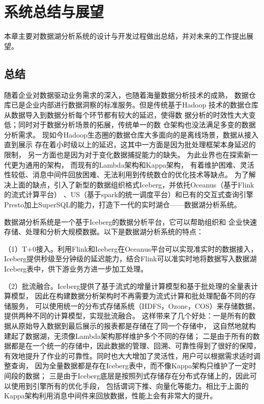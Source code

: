
\chapter{系统总结与展望}

本章主要对数据湖分析系统的设计与开发过程做出总结，并对未来的工作提出展望。

\section{总结}

随着企业对数据驱动业务需求的深入，也随着海量数据分析技术的成熟，
数据仓库已是企业内部进行数据洞察的标准服务。但是传统基于Hadoop
技术的数据仓库从数据导入到数据分析每个环节都有较大的延迟，使得数
据分析的时效性大大变低；同时对于数据分析场景的拓展，传统单一的数
仓架构也没法满足多变的数据分析需求。
现如今Hadoop生态圈的数据仓库大多面向的是离线场景，数据从接入直到展示
存在着小时级以上的延迟，这其中一方面是因为批处理框架本身延迟的限制，
另一方面也是因为对于变化数据捕捉能力的缺失。
为此业界也在探索新一代更为通用的架构，
而现有的Lambda架构和Kappa架构，
有着维护困难、灵活性较低、消息中间件回放困难、无法利用到传统数仓的优化技术等缺点。
为了解决上面的缺点，引入了新型的数据组织格式Iceberg，并依托Oceanus（基于Flink的流式计算平台）
、US（基于spark的统一调度平台）和已有的交互式查询引擎Presto加上SuperSQL的能力，打造下一代的实时湖仓——数据湖分析系统。

数据湖分析系统是一个基于Iceberg的数据分析平台，它可以帮助组织和
企业快速存储、处理和分析大规模数据。以下是数据湖分析系统的特点：

（1）T+0接入。利用Flink和Iceberg在Oceanus平台可以实现准实时的数据接入，
Iceberg提供秒级至分钟级的延迟能力，结合Flink可以准实时地将数据写入数据湖Iceberg表中，供下游业务方进一步加工处理。

（2）批流融合。Iceberg提供了基于流式的增量计算模型和基于批处理的全量表计算模型，
因此在构建数据分析架构时不再需要为流式计算和批处理配备不同的存储服务，
可以使用统一的分布式存储系统（HDFS，Ozone，COS）来存储数据，提供两种不同的计算模型，实现批流融合。
这样带来了几个好处：一是所有的数据从原始导入数据到最后展示的报表都是存储在了同一个存储中，
这自然地就构建起了数据湖，无须像Lambda架构那样维护多个不同的存储；
二是由于所有的数据都是在一个统一的存储中，因此数据的管理、回溯、可靠性得到了很好的保障，
有效地提升了作业的可靠性。同时也大大增加了灵活性，用户可以根据需求适时调整查询，
因为全量数据都是存在Iceberg表中，而不像Kappa架构只维护了一定时间段的数据；
三是由于Iceberg底层是按照列式存储存在分布式存储上的，因此可以使用到引擎所有的优化手段，
包括谓词下推、向量化等能力。相比于上面的Kappa架构利用消息中间件来回放数据，性能上会有非常大的提升。

